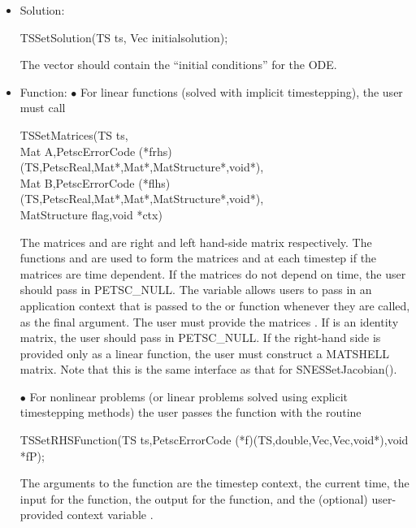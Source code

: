 \begin{itemize}
\item Solution:
\begin{tabbing}
 TSSetSolution(TS ts, Vec initialsolution);
\end{tabbing}
The vector  should contain the ``initial conditions''
for the ODE. 

\item Function: 
\subitem $ \bullet $ For linear functions (solved with implicit timestepping),
 the user must call 
\begin{tabbing}
TSSetMatrices(TS ts,\\
Mat A,PetscErrorCode (*frhs)(TS,PetscReal,Mat*,Mat*,MatStructure*,void*),\\
Mat B,PetscErrorCode (*flhs)(TS,PetscReal,Mat*,Mat*,MatStructure*,void*),\\
MatStructure flag,void *ctx)
\end{tabbing}
The matrices  and  are right and left hand-side matrix respectively.
The functions  and  are used to form the matrices  and  
at each timestep if the matrices are time dependent.
If the matrices do not depend on time, the user should 
pass in PETSC_NULL.  The variable  allows 
users to pass in an application context that is passed to the  or  function 
whenever they are called, as the final argument. The user must provide the matrices
. If  is an identity matrix, the user should pass in PETSC_NULL. 
If the right-hand side is provided only as a linear
function, the user must construct a MATSHELL matrix. Note that this is 
the same interface as that for SNESSetJacobian(). 

\subitem $ \bullet $  For nonlinear problems (or linear problems solved using
explicit timestepping methods) the user  passes the function with 
the routine

\begin{tabbing}
 TSSetRHSFunction(TS ts,PetscErrorCode (*f)(TS,double,Vec,Vec,void*),void *fP);
\end{tabbing}
The arguments to the function  are
the timestep context, the current time, the input for the function,
the output for the function, and the (optional) user-provided context
variable .


\end{itemize}

